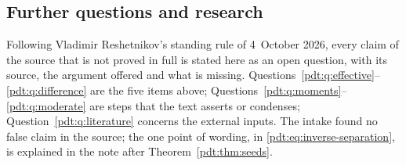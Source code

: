 \subsection{Further questions and research}\label{pdt:sec:further}
\begin{writenote}
Following Vladimir Reshetnikov's standing rule of 4~October 2026, every
claim of the source that is not proved in full is stated here as an open
question, with its source, the argument offered and what is missing.
Questions~\ref{pdt:q:effective}--\ref{pdt:q:difference} are the five items
above; Questions~\ref{pdt:q:moments}--\ref{pdt:q:moderate} are steps that
the text asserts or condenses; Question~\ref{pdt:q:literature} concerns the
external inputs. The intake found no false claim in the source; the one
point of wording, in \eqref{pdt:eq:inverse-separation}, is explained in the
note after Theorem~\ref{pdt:thm:seeds}.
\end{writenote}
